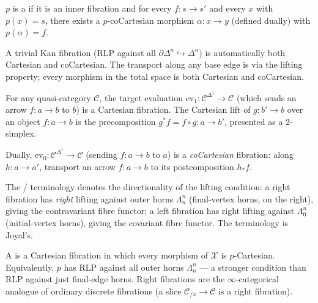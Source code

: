 \begin{definition}
\label{def:cocartesian-fibration}
$p$ is a  if it is an inner fibration and
for every $f : s \to s'$ and every $x$ with $p(x) = s$, there exists a
$p$-coCartesian morphism $\alpha : x \to y$ (defined dually) with
$p(\alpha) = f$.
\end{definition}

\begin{example_thm}
\label{ex:trivial-fib-cart}
A trivial Kan fibration (RLP against all $\partial\Delta^n \hookrightarrow
\Delta^n$) is automatically both Cartesian and coCartesian. The
transport along any base edge is via the lifting property; every morphism
in the total space is both Cartesian and coCartesian.
\end{example_thm}

\begin{example_thm}
\label{ex:target-eval}
For any quasi-category $\mathcal{C}$, the target evaluation
$\mathrm{ev}_1 : \mathcal{C}^{\Delta^1} \to \mathcal{C}$ (which sends
an arrow $f : a \to b$ to $b$) is a Cartesian fibration. The Cartesian
lift of $g : b' \to b$ over an object $f : a \to b$ is the precomposition
$g^* f = f \circ g : a \to b'$, presented as a $2$-simplex.
\end{example_thm}

\begin{example_thm}
\label{ex:source-eval}
Dually, $\mathrm{ev}_0 : \mathcal{C}^{\Delta^1} \to \mathcal{C}$ (sending
$f : a \to b$ to $a$) is a \emph{coCartesian} fibration: along $h : a \to
a'$, transport an arrow $f : a \to b$ to its postcomposition $h_* f$.
\end{example_thm}

\begin{nameorigin}
The  /  terminology denotes
the directionality of the lifting condition: a right fibration has
\emph{right} lifting against outer horns $\Lambda^n_n$ (final-vertex
horns, on the right), giving the contravariant fibre functor; a left
fibration has right lifting against $\Lambda^n_0$ (initial-vertex
horns), giving the covariant fibre functor. The terminology is Joyal's.
\end{nameorigin}

\begin{example_thm}
\label{ex:right-fib}
A  is a Cartesian fibration in which every morphism
of $\mathcal{X}$ is $p$-Cartesian. Equivalently, $p$ has RLP against
all outer horns $\Lambda^n_n$ — a stronger condition than RLP against
just final-edge horns. Right fibrations are the $\infty$-categorical
analogue of ordinary discrete fibrations (a slice $\mathcal{C}_{/x} \to
\mathcal{C}$ is a right fibration).
\end{example_thm}

